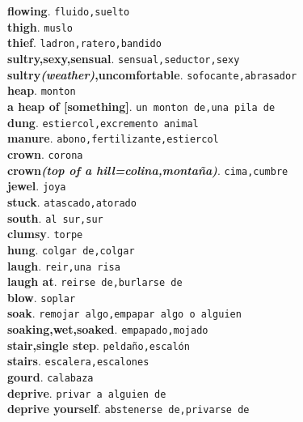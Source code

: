 \documentclass[twocolumn]{article}
\begin{document}
	\textsf{\textbf{flowing}}. \texttt{fluido,suelto}\\
	\textsf{\textbf{thigh}}. \texttt{muslo}\\
	\textsf{\textbf{thief}}. \texttt{ladron,ratero,bandido}\\
	\textsf{\textbf{sultry,sexy,sensual}}. \texttt{sensual,seductor,sexy}\\
	\textsf{\textbf{sultry{\scriptsize \textsl{(weather)}},uncomfortable}}. \texttt{sofocante,abrasador}\\
	\textsf{\textbf{heap}}. \texttt{monton}\\
  \textsf{\textbf{a heap of [something]}}. \texttt{un monton de,una pila de}\\
	\textsf{\textbf{dung}}. \texttt{estiercol,excremento animal}\\
	\textsf{\textbf{manure}}. \texttt{abono,fertilizante,estiercol}\\
	\textsf{\textbf{crown}}. \texttt{corona}\\
	\textsf{\textbf{crown{\scriptsize \textsl{(top of a hill=colina,monta\~na)}}}}. \texttt{cima,cumbre}\\
	\textsf{\textbf{jewel}}. \texttt{joya}\\
	\textsf{\textbf{stuck}}. \texttt{atascado,atorado}\\
	\textsf{\textbf{south}}. \texttt{al sur,sur}\\
	\textsf{\textbf{clumsy}}. \texttt{torpe}\\
	\textsf{\textbf{hung}}. \texttt{colgar de,colgar}\\
	\textsf{\textbf{laugh}}. \texttt{reir,una risa}\\
	\textsf{\textbf{laugh at}}. \texttt{reirse de,burlarse de}\\
	\textsf{\textbf{blow}}. \texttt{soplar}\\
	\textsf{\textbf{soak}}. \texttt{remojar algo,empapar algo o alguien}\\
	\textsf{\textbf{soaking,wet,soaked}}. \texttt{empapado,mojado}\\
	\textsf{\textbf{stair,single step}}. \texttt{pelda\~no,escal\'on}\\
	\textsf{\textbf{stairs}}. \texttt{escalera,escalones}\\
	\textsf{\textbf{gourd}}. \texttt{calabaza}\\
	\textsf{\textbf{deprive}}. \texttt{privar a alguien de}\\
	\textsf{\textbf{deprive yourself}}. \texttt{abstenerse de,privarse de}\\
\end{document}
